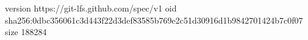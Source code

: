 version https://git-lfs.github.com/spec/v1
oid sha256:0dbc356061c3d443f22d3def83585b769e2c51d30916d1b9842701424b7c0f07
size 188284
